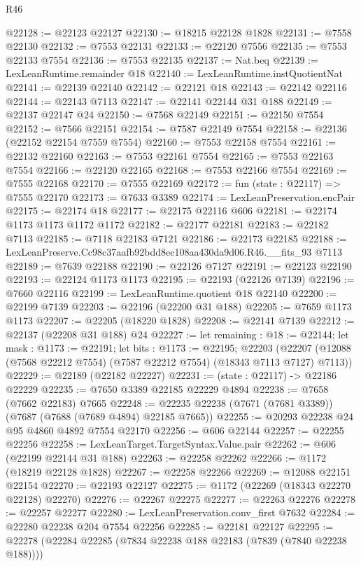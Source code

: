 \begin{lexlean}{R46}
\begin{coremodule}
@22128 := @22123 @22127
@22130 := @18215 @22128 @1828
@22131 := @7558 @22130
@22132 := @7553 @22131
@22133 := @22120 @7556
@22135 := @7553 @22133 @7554
@22136 := @7553 @22135
@22137 := Nat.beq
@22139 := LexLeanRuntime.remainder @18
@22140 := LexLeanRuntime.instQuotientNat
@22141 := @22139 @22140
@22142 := @22121 @18
@22143 := @22142 @22116
@22144 := @22143 @7113
@22147 := @22141 @22144 @31 @188
@22149 := @22137 @22147 @24
@22150 := @7568 @22149
@22151 := @22150 @7554
@22152 := @7566 @22151
@22154 := @7587 @22149 @7554
@22158 := @22136 (@22152 @22154 @7559 @7554)
@22160 := @7553 @22158 @7554
@22161 := @22132 @22160
@22163 := @7553 @22161 @7554
@22165 := @7553 @22163 @7554
@22166 := @22120 @22165
@22168 := @7553 @22166 @7554
@22169 := @7555 @22168
@22170 := @7555 @22169
@22172 := fun (state : @22117) => @7555 @22170
@22173 := @7633 @3389
@22174 := LexLeanPreservation.encPair
@22175 := @22174 @18
@22177 := @22175 @22116 @606
@22181 := @22174 @1173 @1173 @1172 @1172
@22182 := @22177 @22181
@22183 := @22182 @7113
@22185 := @7118 @22183 @7121
@22186 := @22173 @22185
@22188 := LexLeanPreserve.Cc98c37aafb92bdd8ec108aa430da9d06.R46.__fits_93 @7113
@22189 := @7639 @22188
@22190 := @22126 @7127
@22191 := @22123 @22190
@22193 := @22124 @1173 @1173
@22195 := @22193 (@22126 @7139)
@22196 := @7660 @22116
@22199 := LexLeanRuntime.quotient @18 @22140
@22200 := @22199 @7139
@22203 := @22196 (@22200 @31 @188)
@22205 := @7659 @1173 @1173
@22207 := @22205 (@18220 @1828)
@22208 := @22141 @7139
@22212 := @22137 (@22208 @31 @188) @24
@22227 := let remaining : @18 := @22144;
  let mask : @1173 := @22191;
  let bits : @1173 := @22195;
  @22203 (@22207 (@12088 (@7568 @22212 @7554) (@7587 @22212 @7554) (@18343 @7113 @7127) @7113))
@22229 := @22189 (@22182 @22227)
@22231 := (state : @22117) -> @22186 @22229
@22235 := @7650 @3389 @22185 @22229 @4894
@22238 := @7658 (@7662 @22183) @7665
@22248 := @22235 @22238 (@7671 (@7681 @3389)) (@7687 (@7688 (@7689 @4894) @22185 @7665))
@22255 := @20293 @22238 @24 @95 @4860 @4892 @7554 @22170
@22256 := @606 @22144
@22257 := @22255 @22256
@22258 := LexLeanTarget.TargetSyntax.Value.pair
@22262 := @606 (@22199 @22144 @31 @188)
@22263 := @22258 @22262
@22266 := @1172 (@18219 @22128 @1828)
@22267 := @22258 @22266
@22269 := @12088 @22151 @22154
@22270 := @22193 @22127
@22275 := @1172 (@22269 (@18343 @22270 @22128) @22270)
@22276 := @22267 @22275
@22277 := @22263 @22276
@22278 := @22257 @22277
@22280 := LexLeanPreservation.conv_first @7632
@22284 := @22280 @22238 @204 @7554 @22256
@22285 := @22181 @22127
@22295 := @22278 (@22284 @22285 (@7834 @22238 @188 @22183 (@7839 (@7840 @22238 @188))))

\end{coremodule}
\end{lexlean}
